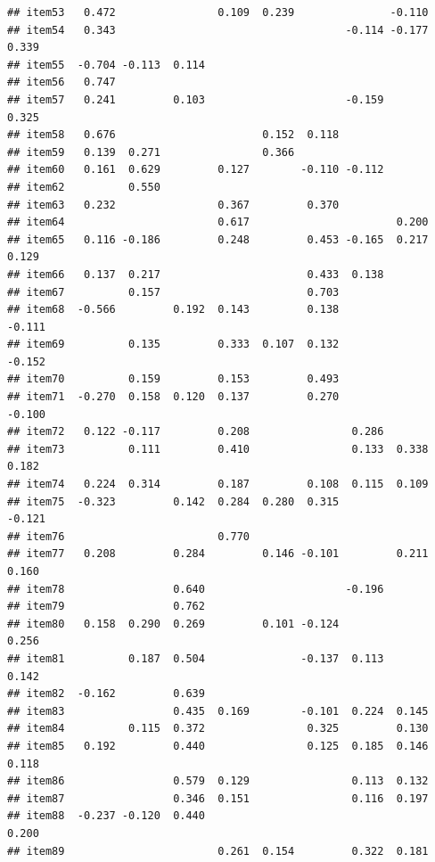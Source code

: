 \documentclass[
  english,
  man]{apa6}
\begin{document}
\begin{verbatim}
## item53   0.472                0.109  0.239               -0.110       
## item54   0.343                                    -0.114 -0.177  0.339
## item55  -0.704 -0.113  0.114                                          
## item56   0.747                                                        
## item57   0.241         0.103                      -0.159         0.325
## item58   0.676                       0.152  0.118                     
## item59   0.139  0.271                0.366                            
## item60   0.161  0.629         0.127        -0.110 -0.112              
## item62          0.550                                                 
## item63   0.232                0.367         0.370                     
## item64                        0.617                       0.200       
## item65   0.116 -0.186         0.248         0.453 -0.165  0.217  0.129
## item66   0.137  0.217                       0.433  0.138              
## item67          0.157                       0.703                     
## item68  -0.566         0.192  0.143         0.138               -0.111
## item69          0.135         0.333  0.107  0.132               -0.152
## item70          0.159         0.153         0.493                     
## item71  -0.270  0.158  0.120  0.137         0.270               -0.100
## item72   0.122 -0.117         0.208                0.286              
## item73          0.111         0.410                0.133  0.338  0.182
## item74   0.224  0.314         0.187         0.108  0.115  0.109       
## item75  -0.323         0.142  0.284  0.280  0.315               -0.121
## item76                        0.770                                   
## item77   0.208         0.284         0.146 -0.101         0.211  0.160
## item78                 0.640                      -0.196              
## item79                 0.762                                          
## item80   0.158  0.290  0.269         0.101 -0.124                0.256
## item81          0.187  0.504               -0.137  0.113         0.142
## item82  -0.162         0.639                                          
## item83                 0.435  0.169        -0.101  0.224  0.145       
## item84          0.115  0.372                0.325         0.130       
## item85   0.192         0.440                0.125  0.185  0.146  0.118
## item86                 0.579  0.129                0.113  0.132       
## item87                 0.346  0.151                0.116  0.197       
## item88  -0.237 -0.120  0.440                                     0.200
## item89                        0.261  0.154         0.322  0.181       

\end{verbatim}
\end{document}

